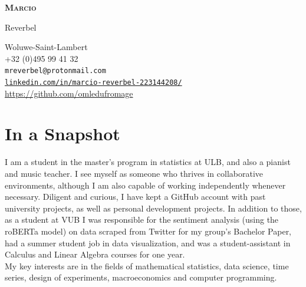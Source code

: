 \documentclass[12pt]{article}
\newcommand{\mycolor}{Fuchsia}
\newcommand{\thesectionicon}{}
\newcommand{\sectionicon}[1]{\renewcommand{\thesectionicon}{#1}}
\begin{document}
\begin{minipage}[t]{0.25\textwidth}
  {\sffamily\bfseries\scshape\huge
    Marcio
    
         \vspace{1ex}
     
    Reverbel}
\end{minipage}
\hfill
\begin{minipage}[t]{0.65\textwidth}
  \begin{small}
  \begin{flushright}
  Woluwe-Saint-Lambert\ \ \textcolor{\mycolor}{\faHome\\}
  +32 (0)495 99 41 32\ \ \textcolor{\mycolor}{\faPhone\\}
  \texttt{mreverbel@protonmail.com}\ \ \textcolor{\mycolor}{\faEnvelope\\}
  \href{https://linkedin.com/in/marcio-reverbel-223144208/}{\texttt{linkedin.com/in/marcio-reverbel-223144208/}}\ \ \textcolor{\mycolor}{\faLinkedin\\}
  \url{https://github.com/omledufromage}\ \ \textcolor{\mycolor}{\faGithub\\}
  \end{flushright}
  \end{small}
\end{minipage}

\sectionicon{\faUser}
\section{In a Snapshot}

I am a student in the master's program in statistics at ULB, and also a pianist and music teacher. I see myself as someone who thrives in collaborative environments, although I am also capable of working independently whenever necessary. Diligent and curious, I have kept a GitHub account with past university projects, as well as personal development projects. In addition to those, as a student at VUB I was responsible for the sentiment analysis (using the roBERTa model) on data scraped from Twitter for my group's Bachelor Paper, had a summer student job in data visualization, and was a student-assistant in Calculus and Linear Algebra courses for one year. \\

My key interests are in the fields of mathematical statistics, data science, time series, design of experiments, macroeconomics and computer programming.
\end{document}
